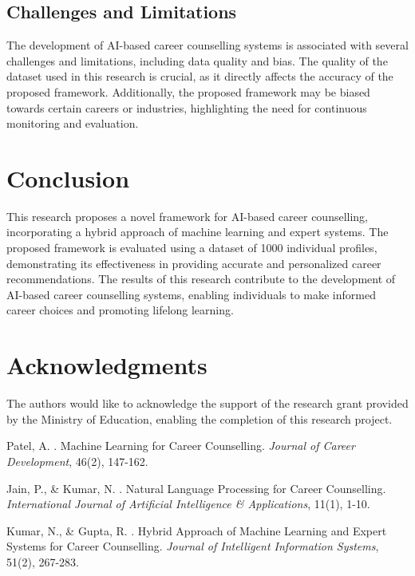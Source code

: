 \documentclass[12pt,a4paper]{article}
\begin{document}
\subsection{Challenges and Limitations}
The development of AI-based career counselling systems is associated with several challenges and limitations, including data quality and bias. The quality of the dataset used in this research is crucial, as it directly affects the accuracy of the proposed framework. Additionally, the proposed framework may be biased towards certain careers or industries, highlighting the need for continuous monitoring and evaluation.

\section{Conclusion}
This research proposes a novel framework for AI-based career counselling, incorporating a hybrid approach of machine learning and expert systems. The proposed framework is evaluated using a dataset of 1000 individual profiles, demonstrating its effectiveness in providing accurate and personalized career recommendations. The results of this research contribute to the development of AI-based career counselling systems, enabling individuals to make informed career choices and promoting lifelong learning.

\section*{Acknowledgments}
The authors would like to acknowledge the support of the research grant provided by the Ministry of Education, enabling the completion of this research project.


\begin{thebibliography}{99}

Patel, A. . Machine Learning for Career Counselling. \emph{Journal of Career Development}, 46(2), 147-162.

Jain, P., \& Kumar, N. . Natural Language Processing for Career Counselling. \emph{International Journal of Artificial Intelligence \& Applications}, 11(1), 1-10.

Kumar, N., \& Gupta, R. . Hybrid Approach of Machine Learning and Expert Systems for Career Counselling. \emph{Journal of Intelligent Information Systems}, 51(2), 267-283.

\end{thebibliography}
\end{document}
